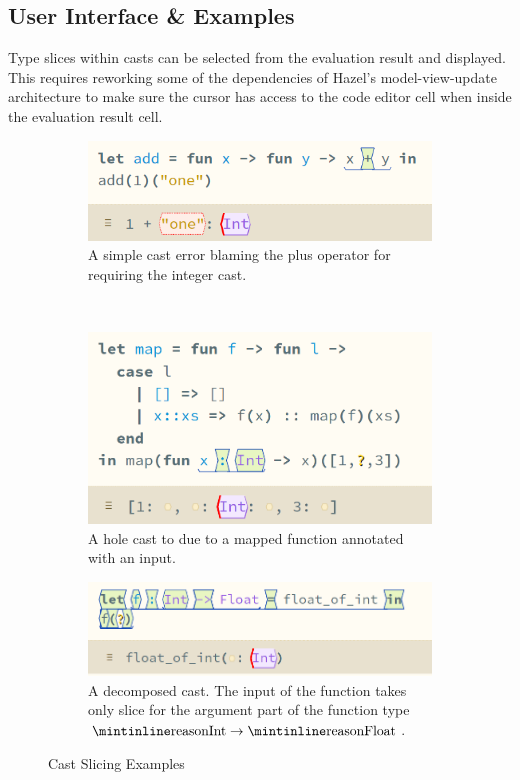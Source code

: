 \subsection{User Interface \& Examples}
Type slices within casts can be selected from the evaluation result and displayed. This requires reworking some of the dependencies of Hazel's model-view-update architecture to make sure the cursor has access to the code editor cell when inside the evaluation result cell.
\begin{figure}[h]
\centering
\begin{subfigure}{0.45\textwidth}
\centering
\includegraphics[width=1\textwidth]{Media/Figures/simple_cast_error}
\caption{A simple cast error blaming the plus operator for requiring the integer cast.}
\end{subfigure}$\qquad$
\begin{subfigure}{0.45\textwidth}
\centering
\includegraphics[width=1\textwidth]{Media/Figures/map_cast}
\caption{A hole cast to  due to a mapped function annotated with an  input.}
\end{subfigure}
\begin{subfigure}{0.65\textwidth}
\centering
\includegraphics[width=1\textwidth]{Media/Figures/decompose_casts}
\caption{A decomposed cast. The input of the function takes only slice for the argument part  of the function type $\code{Int} \to \code{Float}$.}
\end{subfigure}
\caption{Cast Slicing Examples}
\end{figure}
